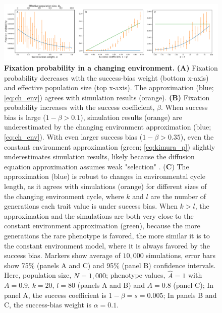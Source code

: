 \documentclass[12pt]{extarticle}
\begin{document}
\begin{figure}[H]
	\centering
    \includegraphics[width=\linewidth]{ch_env.pdf}
  \caption{\textbf{Fixation probability in a changing environment.}
\textbf{(A)} Fixation probability decreases with {the} success-bias weight (bottom x-axis) and effective population size (top x-axis). The approximation (blue; \cref{eq:ch_env}) agrees with simulation results (orange). 
\textbf{(B)} Fixation probability increases with the success coefficient, $\beta$.
When success bias is large ($1-\beta > 0.1$),  
simulation results (orange) are underestimated by the changing environment approximation (blue; \cref{eq:ch_env}). With even larger success bias ($1-\beta > 0.35$), even the constant environment approximation (green; \cref{eq:kimura_p}) slightly underestimates simulation results, likely because the diffusion equation approximation assumes weak "selection" .
(\textbf{C}) The approximation (blue) is robust to changes in environmental cycle length, as it agrees with simulations (orange) for different sizes of the changing environment cycle, where $k$ and $l$ are the number of generations each trait value is under success bias. 
When $k>l$, the approximation and the simulations are both very close to the constant environment approximation (green), because the more generations the rare phenotype is favored, the more similar it is to the constant environment model, where it is always favored by the success bias.
Markers show average of $10,000$ simulations, error bars show 75\% (panels A and C) and 95\% (panel B) confidence intervals.
Here, population size, $N=1,000$; phenotype values, $\hat{A}=1$ with $A=0.9$, $k=20$, $l=80$ (panels A and B) and $A=0.8$ (panel C); In panel A, the success coefficient is $1-\beta=s=0.005$; In panels B and C, the success-bias weight is $\alpha=0.1$.
  }
  \label{fig:ch_env_alpha_beta}
\end{figure}


\end{document}
